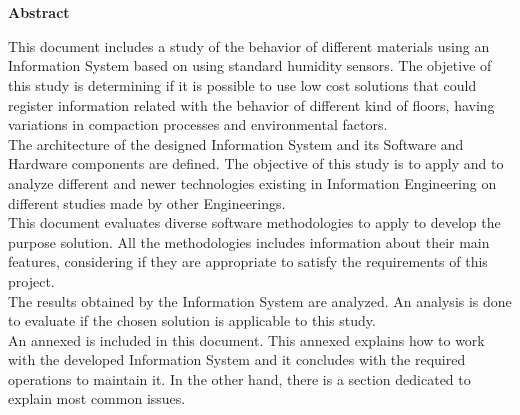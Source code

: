 

\newpage


\chapter*{}
\begin{center}
\textbf{Abstract}
\end{center}

This document includes a study of the behavior of different materials using an Information System based on using standard humidity sensors. The objetive of this study is determining if it is possible to use low cost solutions that could register information related with the behavior of different kind of floors, having variations in compaction processes and environmental factors.\\

The architecture of the designed Information System and its Software and Hardware components are defined. The objective of this study is to apply and to analyze different and newer technologies existing in Information Engineering on different studies made by other Engineerings.\\

This document evaluates diverse software methodologies to apply to develop the purpose solution. All the methodologies includes information about their main features, considering if they are appropriate to satisfy the requirements of this project.\\

The results obtained by the Information System are analyzed. An analysis is done to evaluate if the chosen solution is applicable to this study.\\

An annexed is included in this document. This annexed explains how to work with the developed Information System and it concludes with the required operations to maintain it. In the other hand, there is a section dedicated to explain most common issues.

